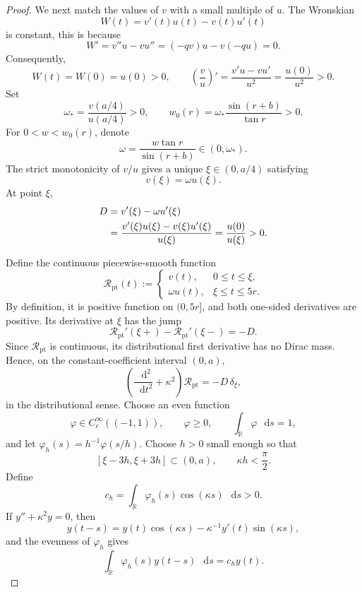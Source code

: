 \documentclass[11pt,reqno]{amsart}
\theoremstyle{definition}
\numberwithin{equation}{section}
\newcommand{\dd}{\mathop{}\!\mathrm d}
\begin{document}
\begin{proof}
We next match the values of \(v\) with a small multiple of \(u\).
The Wronskian
\[
 W(t)=v'(t)u(t)-v(t)u'(t)
\]
is constant, this is because
\[
 W'=v''u-vu''=(-qv)u-v(-qu)=0.
\]
Consequently,
\[
 W(t)=W(0)=u(0)>0,\qquad
 \left(\frac vu\right)'
 =\frac{v'u-vu'}{u^2}
 =\frac{u(0)}{u^2}>0.
\]
Set
\[
 \omega_*=\frac{v(a/4)}{u(a/4)}>0,\qquad
 w_0(r)=\omega_*\frac{\sin(r+b)}{\tan r}>0.
\]
For \(0<w<w_0(r)\), denote
\[
 \omega=\frac{w\tan r}{\sin(r+b)}\in(0,\omega_*).
\]
The strict monotonicity of \(v/u\) gives a unique
\(\xi\in(0,a/4)\) satisfying
\begin{equation}
 v(\xi)=\omega u(\xi).
 \label{eq:warping-value-match}
\end{equation}
At point $\xi$, 
\begin{align}
 D
 &=v'(\xi)-\omega u'(\xi)\notag\\
 &=\frac{v'(\xi)u(\xi)-v(\xi)u'(\xi)}{u(\xi)}
 =\frac{u(0)}{u(\xi)}>0.
 \label{eq:warping-derivative-drop}
\end{align}

Define the continuous piecewise-smooth function
\[
 \mathcal R_{\mathrm{pt}}(t):=
 \begin{cases}
  v(t),&0\le t\le\xi,\\
  \omega u(t),&\xi\le t\le5r.
 \end{cases}
\]
By definition, it is positive function on \((0,5r]\), and both one-sided derivatives are
positive.  Its derivative at $\xi$ has the jump
\[
 \mathcal R_{\mathrm{pt}}'(\xi+)
 -\mathcal R_{\mathrm{pt}}'(\xi-)=-D.
\]
Since \(\mathcal R_{\mathrm{pt}}\) is continuous, its distributional
first derivative has no Dirac mass.  Hence, on the constant-coefficient
interval \((0,a)\),
\begin{equation}
 \left(\frac{\dd^2}{\dd t^2}+\kappa^2\right)
 \mathcal R_{\mathrm{pt}}
 =-D\,\delta_\xi,
 \label{eq:warping-corner-distribution}
\end{equation}
in the distributional sense.
Choose an even function
\[
 \varphi\in C_c^\infty((-1,1)),\qquad
 \varphi\ge0,\qquad \int_{\mathbb R}\varphi\,\dd s=1,
\]
and let \(\varphi_h(s)=h^{-1}\varphi(s/h)\).  Choose \(h>0\) small enough so
that
\[
 [\xi-3h,\xi+3h]\subset(0,a),
 \qquad \kappa h<\frac{\pi}{2}.
\]
Define
\[
 c_h=\int_{\mathbb R}
       \varphi_h(s)\cos(\kappa s)\,\dd s>0.
\]
If \(y''+\kappa^2y=0\), then
\[
 y(t-s)=y(t)\cos(\kappa s)
        -\kappa^{-1}y'(t)\sin(\kappa s),
\]
and the evenness of \(\varphi_h\) gives
\begin{equation}
 \int_{\mathbb R}\varphi_h(s)y(t-s)\,\dd s=c_hy(t).
 \label{eq:warping-convolution-eigenfunction}
\end{equation}


\end{proof}
\end{document}
